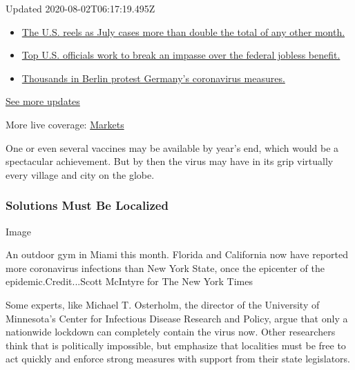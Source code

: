 Updated 2020-08-02T06:17:19.495Z

\begin{itemize}
\tightlist
\item
  \href{https://www.nytimes.com/2020/08/01/world/coronavirus-covid-19.html?action=click\&pgtype=Article\&state=default\&region=MAIN_CONTENT_1\&context=storylines_live_updates\#link-34047410}{The
  U.S. reels as July cases more than double the total of any other
  month.}
\item
  \href{https://www.nytimes.com/2020/08/01/world/coronavirus-covid-19.html?action=click\&pgtype=Article\&state=default\&region=MAIN_CONTENT_1\&context=storylines_live_updates\#link-780ec966}{Top
  U.S. officials work to break an impasse over the federal jobless
  benefit.}
\item
  \href{https://www.nytimes.com/2020/08/01/world/coronavirus-covid-19.html?action=click\&pgtype=Article\&state=default\&region=MAIN_CONTENT_1\&context=storylines_live_updates\#link-25930521}{Thousands
  in Berlin protest Germany's coronavirus measures.}
\end{itemize}

\href{https://www.nytimes.com/2020/08/01/world/coronavirus-covid-19.html?action=click\&pgtype=Article\&state=default\&region=MAIN_CONTENT_1\&context=storylines_live_updates}{See
more updates}

More live coverage:
\href{https://www.nytimes.com/live/2020/07/31/business/stock-market-today-coronavirus?action=click\&pgtype=Article\&state=default\&region=MAIN_CONTENT_1\&context=storylines_live_updates}{Markets}

One or even several vaccines may be available by year's end, which would
be a spectacular achievement. But by then the virus may have in its grip
virtually every village and city on the globe.

\hypertarget{solutions-must-be-localized}{%
\subsubsection{Solutions Must Be
Localized}\label{solutions-must-be-localized}}

Image

An outdoor gym in Miami this month. Florida and California now have
reported more coronavirus infections than New York State, once the
epicenter of the epidemic.Credit...Scott McIntyre for The New York Times

Some experts, like Michael T. Osterholm, the director of the University
of Minnesota's Center for Infectious Disease Research and Policy, argue
that only a nationwide lockdown can completely contain the virus now.
Other researchers think that is politically impossible, but emphasize
that localities must be free to act quickly and enforce strong measures
with support from their state legislators.

